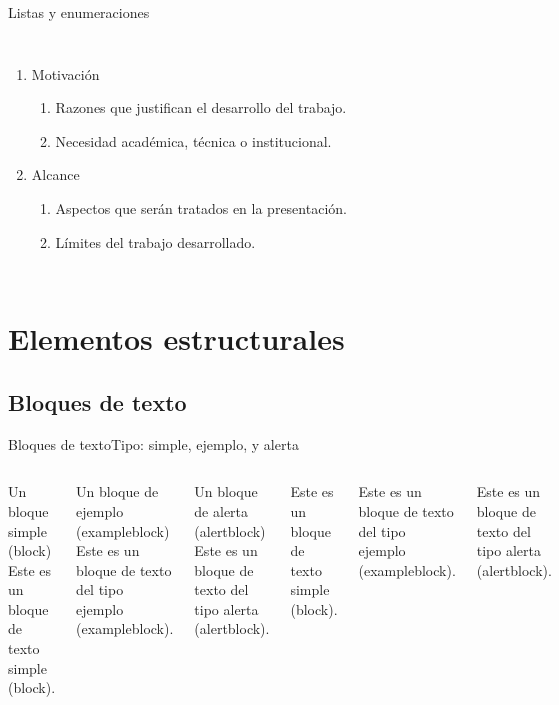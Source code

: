 \documentclass[11pt, aspectratio=169]{beamer}
\begin{document}
\begin{frame}{Listas y enumeraciones}
\begin{columns}[onlytextwidth]
\begin{enumerate}
		    \item Motivación
		    \begin{enumerate}
		        \item Razones que justifican el desarrollo del trabajo.
		        \item Necesidad académica, técnica o institucional.
		    \end{enumerate}
		
		    \item Alcance
		    \begin{enumerate}
		        \item Aspectos que serán tratados en la presentación.
		        \item Límites del trabajo desarrollado.
		    \end{enumerate}
		\end{enumerate}
    \end{columns}
\end{frame}


\section{Elementos estructurales}

\subsection{Bloques de texto}
\begin{frame}{Bloques de texto}{Tipo: simple, ejemplo, y \alert{alerta}}
    \begin{columns}[onlytextwidth]
	    \begin{block}{Un bloque simple (block)}\small
	    		Este es un bloque de texto simple (\alert{block}).
	    \end{block}
	    \begin{exampleblock}{Un bloque de ejemplo (exampleblock)}\small
	    		Este es un bloque de texto del tipo ejemplo (\alert{exampleblock}).
		\end{exampleblock}
	    \begin{alertblock}{Un bloque de alerta (alertblock)}\small
	    		Este es un bloque de texto del tipo alerta (\alert{alertblock}).
	    \end{alertblock}
	    \begin{block}{}\small
	    		Este es un bloque de texto simple (\alert{block}).
	    \end{block}
	    \begin{exampleblock}{}\small
	    		Este es un bloque de texto del tipo ejemplo (\alert{exampleblock}).
		\end{exampleblock}
	    \begin{alertblock}{}\small
	    		Este es un bloque de texto del tipo alerta (\alert{alertblock}).
	    \end{alertblock}
	 \end{columns}
\end{frame}
\end{document}
